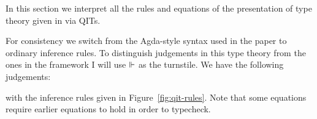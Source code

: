 \documentclass[10pt]{article}
\theoremstyle{definition}
\newcommand{\CTX}{\,\,\mathsf{Ctx}}
\newcommand{\TYPE}{\,\,\mathsf{Type}}
\begin{document}
In this section we interpret all the rules and equations of the presentation of type theory given in \cite{altenkirchkaposi16qit} via QITs. 

For consistency we switch from the Agda-style syntax used in the paper to ordinary inference rules. To distinguish judgements in this type theory from the ones in the framework I will use $\Vdash$ as the turnstile.  We have the following judgements:
with the inference rules given in Figure~\ref{fig:qit-rules}. Note that some equations require earlier equations to hold in order to typecheck.
\end{document}
